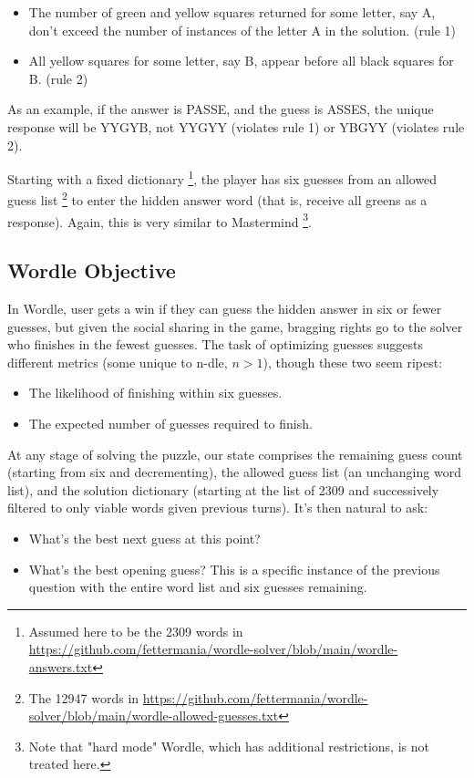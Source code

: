 \documentclass[11pt, oneside]{article} 	%
\begin{document}
\begin{itemize}
\item The number of green and yellow squares returned for some letter, say A, don't exceed the number of instances of the letter A in the solution. (rule 1)
\item All yellow squares for some letter, say B, appear before all black squares for B. (rule 2) 
\end{itemize}
 
 As an example, if the answer is PASSE, and the guess is ASSES, the unique response will be YYGYB, not YYGYY (violates rule 1) or YBGYY (violates rule 2).


Starting with a fixed dictionary \footnote{Assumed here to be the 2309 words in \url{https://github.com/fettermania/wordle-solver/blob/main/wordle-answers.txt}}, the player has six guesses from an allowed guess list \footnote{The 12947 words in \url{https://github.com/fettermania/wordle-solver/blob/main/wordle-allowed-guesses.txt}} to enter the hidden answer word (that is, receive all greens as a response). Again, this is very similar to Mastermind \footnote{Note that "hard mode" Wordle, which has additional restrictions, is not treated here.}.

\subsection{Wordle Objective}

In Wordle, user gets a win if they can guess the hidden answer in six or fewer guesses, but given the social sharing in the game, bragging rights go to the solver who finishes in the fewest guesses. The task of optimizing guesses suggests different metrics (some unique to n-dle, $n > 1$), though these two seem ripest:

\begin{itemize}
\item The likelihood of finishing within six guesses.
\item The expected number of guesses required to finish.
\end{itemize}

At any stage of solving the puzzle, our state comprises the remaining guess count (starting from six and decrementing), the allowed guess list (an unchanging word list), and the solution dictionary (starting at the list of 2309 and successively filtered to only viable words given previous turns). It's then natural to ask:

\begin{itemize}
\item What's the best next guess at this point?
\item What's the best opening guess? This is a specific instance of the previous question with the entire word list and six guesses remaining.
\end{itemize}
\end{document}
